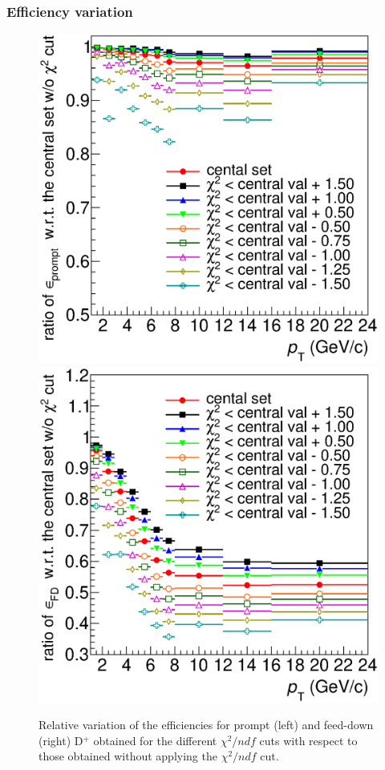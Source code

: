 \documentclass[b5paper,10pt,twoside,oldstyle,classica]{toptesi}
\begin{document}
\subsubsection{Efficiency variation}
\begin{figure}[b]
\begin{center}
{\includegraphics[scale = 0.31]{KF_CutVarSyst_ratioeffprompt_chiS.eps}}
\hspace{-0.5cm}
{\includegraphics[scale = 0.31]{KF_CutVarSyst_ratioeffFD_chiS.eps}}
\caption{Relative variation of the efficiencies for prompt (left) and feed-down (right) D$^+$ obtained for the different $\chi^2/ndf$ cuts with respect to those obtained without applying the $\chi^2/ndf$ cut.}
\label{KF_chivar_eff}
\end{center}
\end{figure} 
\end{document}
